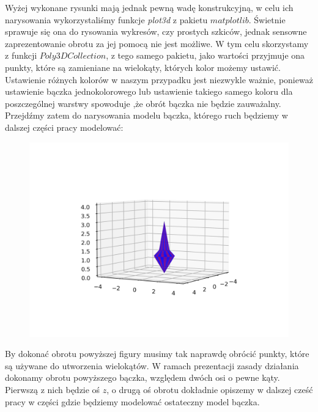 \documentclass[a4paper,twoside,11pt,reqno]{mwrep}
\theoremstyle{plain} \newtheorem{twr}{Twierdzenie}
\theoremstyle{plain} \newtheorem{lem}{Lemat}
\theoremstyle{definition} \newtheorem{defi}{Definicja}
\theoremstyle{remark} \newtheorem*{wni}{Wniosek}
\theoremstyle{definition} \newtheorem{uwaga}{Uwaga}
\theoremstyle{definition}\newtheorem{prz}{Przykład}
\begin{document}
Wyżej wykonane rysunki mają jednak pewną wadę konstrukcyjną, w celu ich narysowania wykorzystaliśmy funkcje 
\textit{plot3d} z pakietu $matplotlib$. Świetnie sprawuje się ona do rysowania wykresów, czy prostych szkiców, jednak
sensowne zaprezentowanie obrotu za jej pomocą nie jest możliwe. W tym celu skorzystamy z funkcji $Poly3DCollection$,
z tego samego pakietu, jako wartości przyjmuje ona punkty, które są zamieniane na wielokąty, 
których kolor możemy ustawić. Ustawienie różnych kolorów w naszym przypadku jest niezwykle ważnie,
ponieważ ustawienie bączka jednokolorowego lub ustawienie takiego samego koloru dla poszczególnej warstwy spowoduje
,że obrót bączka nie będzie zauważalny. Przejdźmy zatem do narysowania modelu bączka, którego ruch będziemy w dalszej
części pracy modelować: 
\begin{figure}[h]
\begin{center}
\includegraphics[width=10 cm]{top_0.png}
\end{center}
\end{figure}

By dokonać obrotu powyższej figury musimy tak naprawdę obrócić punkty, które są używane do utworzenia wielokątów.
W ramach prezentacji zasady działania dokonamy obrotu powyższego bączka, względem dwóch osi o pewne kąty. 
Pierwszą z nich będzie oś $z$, o drugą oś obrotu dokładnie opiszemy w dalszej cześć pracy w części
gdzie będziemy modelować ostateczny model bączka.
\end{document}

